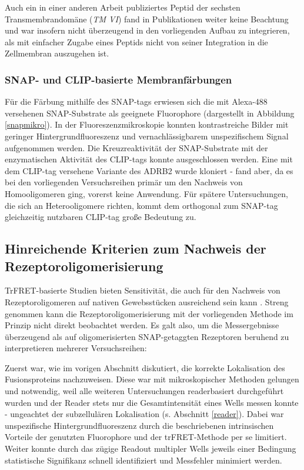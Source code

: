 Auch ein in einer anderen Arbeit \parencite{Hebert1996} publiziertes Peptid der sechsten Transmembrandomäne (\textit{TM VI}) fand in Publikationen weiter keine Beachtung und war insofern nicht überzeugend in den vorliegenden Aufbau zu integrieren, als mit einfacher Zugabe eines Peptids nicht von seiner Integration in die Zellmembran auszugehen ist. 

\subsubsection{SNAP- und CLIP-basierte Membranfärbungen}
Für die Färbung mithilfe des SNAP-tags erwiesen sich die mit Alexa-488 versehenen SNAP-Substrate als geeignete Fluorophore (dargestellt in Abbildung \ref{snapmikro}). In der Fluoreszenzmikroskopie konnten kontrastreiche Bilder mit geringer Hintergrundfluoreszenz und vernachlässigbarem unspezifischem Signal aufgenommen werden. Die Kreuzreaktivität der SNAP-Substrate mit der enzymatischen Aktivität des CLIP-tags konnte ausgeschlossen werden. Eine mit dem CLIP-tag versehene Variante des ADRB2 wurde kloniert - fand aber, da es bei den vorliegenden Versuchsreihen primär um den Nachweis von Homooligomeren ging, vorerst keine Anwendung. Für spätere Untersuchungen, die sich an Heterooligomere richten, kommt dem orthogonal zum SNAP-tag gleichzeitig nutzbaren CLIP-tag große Bedeutung zu.


\subsection{Hinreichende Kriterien zum Nachweis der Rezeptoroligomerisierung}
TrFRET-basierte Studien bieten Sensitivität, die auch für den Nachweis von Rezeptoroligomeren auf nativen Gewebsstücken ausreichend sein kann \parencite{Albizu2010}. Streng genommen kann die Rezeptoroligomerisierung mit der vorliegenden Methode im Prinzip nicht direkt beobachtet werden. Es galt also, um die Messergebnisse überzeugend als auf oligomerisierten SNAP-getaggten Rezeptoren beruhend zu interpretieren mehrerer Versuchsreihen:

Zuerst war, wie im vorigen Abschnitt diskutiert, die korrekte Lokalisation des Fusionsproteins nachzuweisen. Diese war mit mikroskopischer Methoden gelungen und notwendig, weil alle weiteren Untersuchungen readerbasiert durchgeführt wurden und der Reader stets nur die Gesamtintensität eines Wells messen konnte - ungeachtet der subzellulären Lokalisation (s. Abschnitt \ref{reader}). Dabei war unspezifische Hintergrundfluoreszenz durch die beschriebenen intrinsischen Vorteile der genutzten Fluorophore und der trFRET-Methode per se limitiert. Weiter konnte durch das zügige Readout multipler Wells jeweils einer Bedingung statistische Signifikanz schnell identifiziert und Messfehler minimiert werden. 

